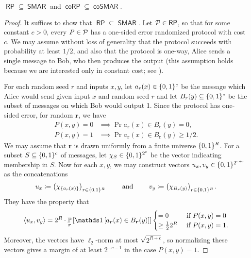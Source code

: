 \documentclass{article}
\newcommand{\cplxclass}[1]{\mathsf{#1}}
\DeclareMathOperator{\RP}{\cplxclass{RP}}
\DeclareMathOperator{\coRP}{\cplxclass{coRP}}
\DeclareMathOperator{\SMAR}{\cplxclass{SMAR}}
\DeclareMathOperator{\coSMAR}{\cplxclass{coSMAR}}
\begin{document}
\begin{boxproposition} \label{prop:rp-in-smar}
    $\RP \subseteq \SMAR$ and $\coRP \subseteq \coSMAR$.
\end{boxproposition}
\begin{proof}
It suffices to show that $\RP \subseteq \SMAR$. Let $\cP \in \RP$, so that for some
constant $c > 0$, every $P \in \mathcal{P}$ has a one-sided error randomized protocol
with cost $c$. We may assume without loss of generality that the protocol
succeeds with probability at least $1/2$, and also that the protocol is one-way, \ie Alice
sends a single message to Bob, who then produces the output (this assumption
holds because we are interested only in constant cost; see \eg \cite{HWZ22}).

For each random seed $r$ and inputs $x,y$, let $a_r(x) \in \{0,1\}^c$ be the message
which Alice would send given input $x$ and random seed $r$ and let $B_r(y)
\subseteq \{0,1\}^c$ be the subset of messages on which Bob would output 1. Since
the protocol has one-sided error, for random $\bm r$, we have
\begin{align*}
    P(x,y) = 0 &\implies \Pr{ a_{\bm r}(x) \in B_{\bm r}(y) } = 0, \\
    P(x,y) = 1 &\implies \Pr{ a_{\bm r}(x) \in B_{\bm r}(y) } \geq 1/2  .
\end{align*}
We may assume that $\bm r$ is drawn uniformly from a finite universe $\{0,1\}^R$.
For a subset $S \subseteq \{0,1\}^c$ of messages, let $\chi_S \in \{0,1\}^{2^c}$
be the vector indicating membership in $S$.
Now for each $x,y$, we may construct vectors $u_x, v_y \in \{0,1\}^{2^{c+r}}$ as the
concatenations
\begin{align*}
    u_x \coloneqq \left( \chi_{\{a_r(x)\}} \right)_{r \in \{0,1\}^R}  
    \qquad\text{ and }\qquad
    v_y \coloneqq \left( \chi_{B_r(y)} \right)_{r \in \{0,1\}^R}.
\end{align*}
They have the property that
\[
    \inn{u_x, v_y}
    = 2^R \cdot \Pru{\bm r}{ \ind{ a_{\bm r}(x) \in B_{\bm r}(y) } }
    \begin{cases}
        = 0 &\text{ if } P(x,y) = 0 \\
        \geq \tfrac{1}{2} 2^R &\text{ if } P(x,y) = 1 .
    \end{cases}
\]
Moreover, the vectors have $\ell_2$-norm at most $\sqrt{2^{R+c}}$, so normalizing these
vectors gives a margin of at least $2^{-c-1}$ in the case $P(x,y) = 1$.
\end{proof}
\end{document}
